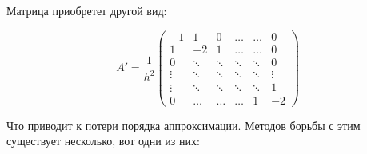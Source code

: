 \documentclass[10pt,a4paper]{article}
\begin{document}
	Матрица приобретет другой вид:
	
	\begin{equation}
			A' = \frac{1}{h^{2}}\begin{pmatrix}
				-1 & 1 & 0 & \ldots & \ldots &0 \\
				1 & -2 & 1 & \ldots & \ldots & 0 \\
				0& \ddots & \ddots &\ddots & \ddots & 0\\
				\vdots & \ddots & \ddots &\ddots & \ddots & \vdots\\
				\vdots & \ddots & \ddots &\ddots & \ddots & 1\\
				0 & \ldots & \ldots & \ldots & 1 & -2 
			\end{pmatrix}
	\end{equation}
	
	Что приводит к потери порядка аппроксимации. Методов борьбы с этим 
	существует несколько, вот одни из них:
\end{document}
